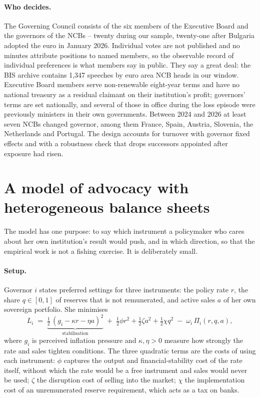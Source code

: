 \documentclass[11pt]{article}
\theoremstyle{plain}
\begin{document}
\paragraph{Who decides.}
The Governing Council consists of the six members of the Executive Board and the governors of the NCBs -- twenty during our sample, twenty-one after Bulgaria adopted the euro in January 2026. Individual votes are not published and no minutes attribute positions to named members, so the observable record of individual preferences is what members say in public. They say a great deal: the BIS archive contains 1{,}347 speeches by euro area NCB heads in our window. Executive Board members serve non-renewable eight-year terms and have no national treasury as a residual claimant on their institution's profit; governors' terms are set nationally, and several of those in office during the loss episode were previously ministers in their own governments. Between 2024 and 2026 at least seven NCBs changed governor, among them France, Spain, Austria, Slovenia, the Netherlands and Portugal. The design accounts for turnover with governor fixed effects and with a robustness check that drops successors appointed after exposure had risen.

\section{A model of advocacy with heterogeneous balance sheets}\label{sec:model}

The model has one purpose: to say which instrument a policymaker who cares about her own institution's result would push, and in which direction, so that the empirical work is not a fishing exercise. It is deliberately small.

\paragraph{Setup.}
Governor $i$ states preferred settings for three instruments: the policy rate $r$, the share $q\in[0,1]$ of reserves that is not remunerated, and active sales $a$ of her own sovereign portfolio. She minimises
\begin{equation}\label{eq:loss}
L_i \;=\; \underbrace{\tfrac12\,(g_i - \kappa r - \eta a)^2}_{\text{stabilisation}} \;+\; \tfrac12 \phi r^2 + \tfrac12 \zeta a^2 + \tfrac12 \chi q^2 \;-\; \omega_i\,\Pi_i(r,q,a),
\end{equation}
where $g_i$ is perceived inflation pressure and $\kappa,\eta>0$ measure how strongly the rate and sales tighten conditions. The three quadratic terms are the costs of using each instrument: $\phi$ captures the output and financial-stability cost of the rate itself, without which the rate would be a free instrument and sales would never be used; $\zeta$ the disruption cost of selling into the market; $\chi$ the implementation cost of an unremunerated reserve requirement, which acts as a tax on banks.
\end{document}
